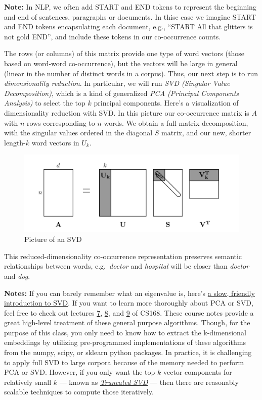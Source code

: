 \documentclass[18pt]{article}
\makeatletter
\def\maxwidth{\ifdim\Gin@nat@width>\linewidth\linewidth
    \else\Gin@nat@width\fi}
\let\Oldincludegraphics\includegraphics
\renewcommand{\includegraphics}[1]{\Oldincludegraphics[width=.8\maxwidth]{#1}}
\makeatother
\begin{document}
\textbf{Note:} In NLP, we often add START and END tokens to represent
the beginning and end of sentences, paragraphs or documents. In thise
case we imagine START and END tokens encapsulating each document, e.g.,
``START All that glitters is not gold END'', and include these tokens in
our co-occurrence counts.

The rows (or columns) of this matrix provide one type of word vectors
(those based on word-word co-occurrence), but the vectors will be large
in general (linear in the number of distinct words in a corpus). Thus,
our next step is to run \emph{dimensionality reduction}. In particular,
we will run \emph{SVD (Singular Value Decomposition)}, which is a kind
of generalized \emph{PCA (Principal Components Analysis)} to select the
top \(k\) principal components. Here's a visualization of dimensionality
reduction with SVD. In this picture our co-occurrence matrix is \(A\)
with \(n\) rows corresponding to \(n\) words. We obtain a full matrix
decomposition, with the singular values ordered in the diagonal \(S\)
matrix, and our new, shorter length-\(k\) word vectors in \(U_k\).

\begin{figure}
\centering
\includegraphics{imgs/svd.png}
\caption{Picture of an SVD}
\end{figure}

This reduced-dimensionality co-occurrence representation preserves
semantic relationships between words, e.g.~\emph{doctor} and
\emph{hospital} will be closer than \emph{doctor} and \emph{dog}.

\textbf{Notes:} If you can barely remember what an eigenvalue is, here's
\href{https://davetang.org/file/Singular_Value_Decomposition_Tutorial.pdf}{a
slow, friendly introduction to SVD}. If you want to learn more
thoroughly about PCA or SVD, feel free to check out lectures
\href{https://web.stanford.edu/class/cs168/l/l7.pdf}{7},
\href{http://theory.stanford.edu/~tim/s15/l/l8.pdf}{8}, and
\href{https://web.stanford.edu/class/cs168/l/l9.pdf}{9} of CS168. These
course notes provide a great high-level treatment of these general
purpose algorithms. Though, for the purpose of this class, you only need
to know how to extract the k-dimensional embeddings by utilizing
pre-programmed implementations of these algorithms from the numpy,
scipy, or sklearn python packages. In practice, it is challenging to
apply full SVD to large corpora because of the memory needed to perform
PCA or SVD. However, if you only want the top \(k\) vector components
for relatively small \(k\) --- known as
\emph{\href{https://en.wikipedia.org/wiki/Singular_value_decomposition\#Truncated_SVD}{Truncated
SVD}} --- then there are reasonably scalable techniques to compute those
iteratively.
\end{document}
